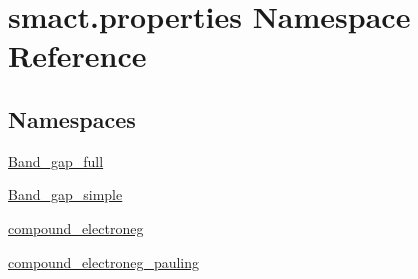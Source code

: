 \hypertarget{namespacesmact_1_1properties}{}\section{smact.\+properties Namespace Reference}
\label{namespacesmact_1_1properties}
\subsection*{Namespaces}
\begin{DoxyCompactItemize}
\item 
 \hyperlink{namespacesmact_1_1properties_1_1_band__gap__full}{Band\+\_\+gap\+\_\+full}
\item 
 \hyperlink{namespacesmact_1_1properties_1_1_band__gap__simple}{Band\+\_\+gap\+\_\+simple}
\item 
 \hyperlink{namespacesmact_1_1properties_1_1compound__electroneg}{compound\+\_\+electroneg}
\item 
 \hyperlink{namespacesmact_1_1properties_1_1compound__electroneg__pauling}{compound\+\_\+electroneg\+\_\+pauling}
\end{DoxyCompactItemize}
